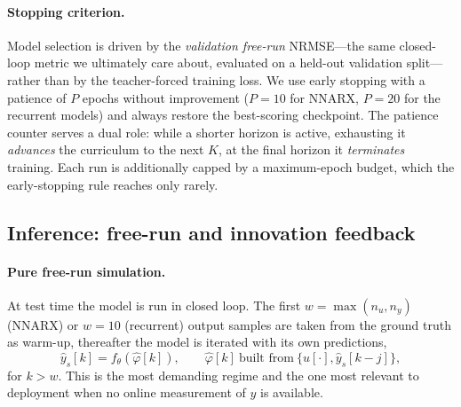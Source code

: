 \documentclass[10pt,twocolumn,letterpaper]{article}
\begin{document}
\paragraph{Stopping criterion.}
Model selection is driven by the \emph{validation free-run} NRMSE---the
same closed-loop metric we ultimately care about, evaluated on a held-out
validation split---rather than by the teacher-forced training loss. We use
early stopping with a patience of $P$ epochs without improvement
($P=10$ for NNARX, $P=20$ for the recurrent models) and always restore the
best-scoring checkpoint. The patience counter serves a dual role: while a
shorter horizon is active, exhausting it \emph{advances} the curriculum to
the next $K$, at the final horizon it \emph{terminates} training. Each run
is additionally capped by a maximum-epoch budget, which the early-stopping
rule reaches only rarely.

\subsection{Inference: free-run and innovation feedback}\label{sec:infer}
\paragraph{Pure free-run simulation.}
At test time the model is run in closed loop. The first
$w=\max(n_u,n_y)$ (NNARX) or $w=10$ (recurrent) output samples are taken
from the ground truth as warm-up, thereafter the model is iterated with
its own predictions,
\begin{equation}
    \hat{y}_s[k] = f_\theta(\hat\varphi[k]), \qquad
    \hat\varphi[k]\ \text{built from}\ \{u[\cdot],\hat{y}_s[k-j]\},
    \label{eq:freerun}
\end{equation}
for $k>w$. This is the most demanding regime and the one most relevant to
deployment when no online measurement of $y$ is available.
\end{document}
